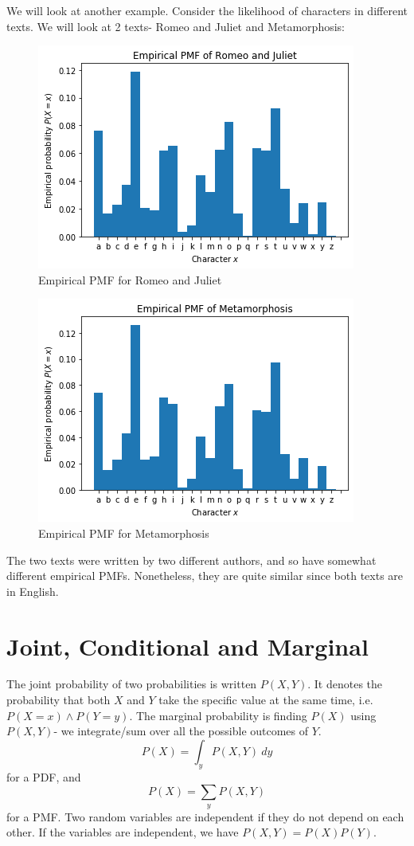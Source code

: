 \documentclass[a4paper, openany]{memoir}
\begin{document}
We will look at another example. Consider the likelihood of characters in different texts. We will look at 2 texts- Romeo and Juliet and Metamorphosis:
\begin{figure}[H]
    \centering
    \includegraphics[scale=0.5]{src/5.5 empirical pmf Romeo Juliet.png}
    \caption{Empirical PMF for Romeo and Juliet}
\end{figure}
\begin{figure}[H]
    \centering
    \includegraphics[scale=0.5]{src/5.6 empirical pmf Metamorphosis.png}
    \caption{Empirical PMF for Metamorphosis}
\end{figure}
\noindent The two texts were written by two different authors, and so have somewhat different empirical PMFs. Nonetheless, they are quite similar since both texts are in English.
\newpage

\section{Joint, Conditional and Marginal}
The joint probability of two probabilities is written $P(X, Y)$. It denotes the probability that both $X$ and $Y$ take the specific value at the same time, i.e. $P(X = x) \land P(Y = y)$. The marginal probability is finding $P(X)$ using $P(X, Y)$- we integrate/sum over all the possible outcomes of $Y$.
\[P(X) = \int_y P(X, Y) \ dy\]
for a PDF, and
\[P(X) = \sum_y P(X, Y)\]
for a PMF. Two random variables are independent if they do not depend on each other. If the variables are independent, we have $P(X, Y) = P(X) P(Y)$.
\end{document}
